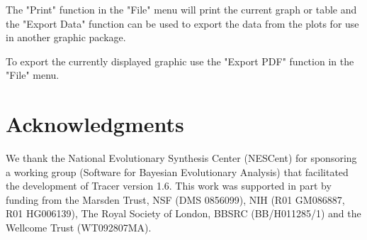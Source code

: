 \documentclass{bioinfo}
\begin{document}
The "Print" function in the "File" menu will print the current graph or table and the "Export Data" function can be used to export the data from the plots for use in another graphic package.

To export the currently displayed graphic use the "Export PDF" function in the "File" menu.



\section*{Acknowledgments}

We thank the National Evolutionary Synthesis Center (NESCent) for sponsoring a working group (Software for Bayesian Evolutionary Analysis) that facilitated the development of Tracer version 1.6. 
This work was supported in part by funding from the Marsden Trust, NSF (DMS 0856099), NIH (R01 GM086887, R01 HG006139), The Royal Society of London, BBSRC (BB/H011285/1) and the Wellcome Trust (WT092807MA).



\end{document}
